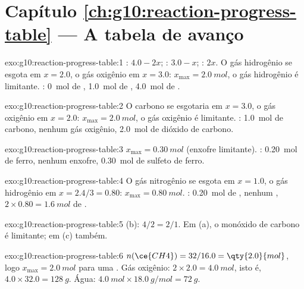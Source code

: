\section*{Capítulo \ref{ch:g10:reaction-progress-table} --- A tabela de avanço}

\begin{solution}{exo:g10:reaction-progress-table:1}
: $4.0 - 2x$; : $3.0 - x$; : $2x$. O gás hidrogênio
se esgota em $x = 2.0$, o gás oxigênio em $x = 3.0$:
$x_{\max} = \qty{2.0}{mol}$, o gás hidrogênio é limitante. :
\qty{0}{mol} de , \qty{1.0}{mol} de , \qty{4.0}{mol} de
.
\end{solution}

\begin{solution}{exo:g10:reaction-progress-table:2}
O carbono se esgotaria em $x = 3.0$, o gás oxigênio em $x = 2.0$:
$x_{\max} = \qty{2.0}{mol}$, o gás oxigênio é limitante. :
\qty{1.0}{mol} de carbono, nenhum gás oxigênio, \qty{2.0}{mol} de
dióxido de carbono.
\end{solution}

\begin{solution}{exo:g10:reaction-progress-table:3}
$x_{\max} = \qty{0.30}{mol}$ (enxofre limitante). :
\qty{0.20}{mol} de ferro, nenhum enxofre, \qty{0.30}{mol} de sulfeto de
ferro.
\end{solution}

\begin{solution}{exo:g10:reaction-progress-table:4}
O gás nitrogênio se esgota em $x = 1.0$, o gás hidrogênio em
$x = 2.4/3 = 0.80$: $x_{\max} = \qty{0.80}{mol}$. :
\qty{0.20}{mol} de , nenhum ,
$2 \times 0.80 = \qty{1.6}{mol}$ de .
\end{solution}

\begin{solution}{exo:g10:reaction-progress-table:5}
(b): $4/2 = 2/1$. Em (a), o monóxido de carbono é limitante; em (c) também.
\end{solution}

\begin{solution}{exo:g10:reaction-progress-table:6}
$n(\ce{CH4}) = 32 / 16.0 = \qty{2.0}{mol}$, logo $x_{\max} = \qty{2.0}{mol}$
para uma . Gás oxigênio:
$2 \times 2.0 = \qty{4.0}{mol}$, isto é, $4.0 \times 32.0 = \qty{128}{g}$. Água:
$\qty{4.0}{mol} \times \qty{18.0}{g/mol} = \qty{72}{g}$.
\end{solution}

